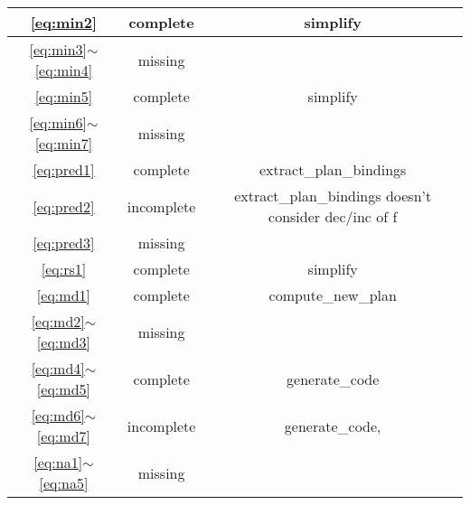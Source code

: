 \documentclass{article}
\begin{document}
\begin{tabular} {|c|c|c|}
\hline \ref{eq:min2}& complete & simplify \\
\hline \ref{eq:min3}$\sim$\ref{eq:min4} & missing & \\
\hline \ref{eq:min5} & complete & simplify \\
\hline \ref{eq:min6}$\sim$\ref{eq:min7} & missing & \\
\hline \ref{eq:pred1} & complete & extract\_plan\_bindings\\
\hline \ref{eq:pred2} & incomplete & extract\_plan\_bindings doesn't consider dec/inc of f\\
\hline \ref{eq:pred3} & missing & \\
\hline \ref{eq:rs1} & complete & simplify \\
\hline \ref{eq:md1} & complete & compute\_new\_plan\\
\hline \ref{eq:md2}$\sim$\ref{eq:md3} & missing & \\
\hline \ref{eq:md4}$\sim$\ref{eq:md5} & complete & generate\_code\\
\hline \ref{eq:md6}$\sim$\ref{eq:md7} & incomplete & generate\_code, \\
\hline \ref{eq:na1}$\sim$\ref{eq:na5} & missing & \\
\hline

\end{tabular}
\pagebreak
\end{document}
